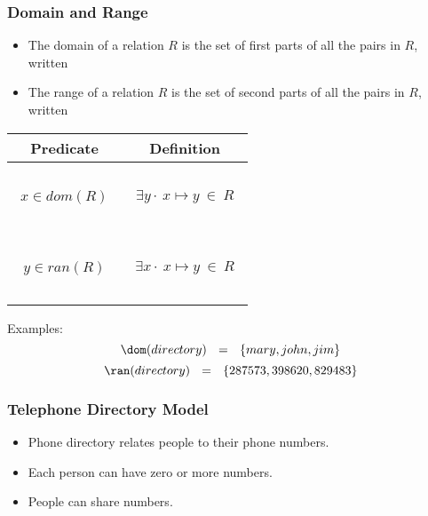 \documentclass{beamer}
\begin{document}
\begin{frame}

\frametitle{Domain and Range}


\begin{itemize}\setlength{\itemsep}{5pt}
\item The \alert{domain} of a relation $R$ is the set of first parts of all the pairs in $R$,
written 

\item The \alert{range} of a relation $R$ is the set of second parts of all the pairs in $R$,
written 
\end{itemize}




\begin{center}
\begin{tabular}{|c|c|}
\hline
Predicate & Definition \\[2pt] \hline
~&\\
$~~x   \in dom(R) ~~$ &  $~~\exists y\cdot~ x \mapsto y~\in~ R~~$  \\
~&\\ \hline
~&\\
$~~y   \in ran(R)  ~~$ &  $~~\exists x\cdot ~ x \mapsto y~\in~ R~~$  \\
~&\\ \hline\end{tabular}
\end{center}


Examples:
\[
    \dom(directory) ~~=~~ \set{ mary, john, jim } 
\]
\[    \ran(directory) ~~=~~ \set{ 287573, 398620, 829483 }
\]



\end{frame}




\begin{frame}


\frametitle{Telephone Directory Model}

\begin{itemize}
\item  Phone directory relates people to their phone numbers.
\item  Each person can have zero or more numbers.
\item  People can share numbers.
\end{itemize}

~


\ENDC

~

%
%

~


\end{frame}
\end{document}
